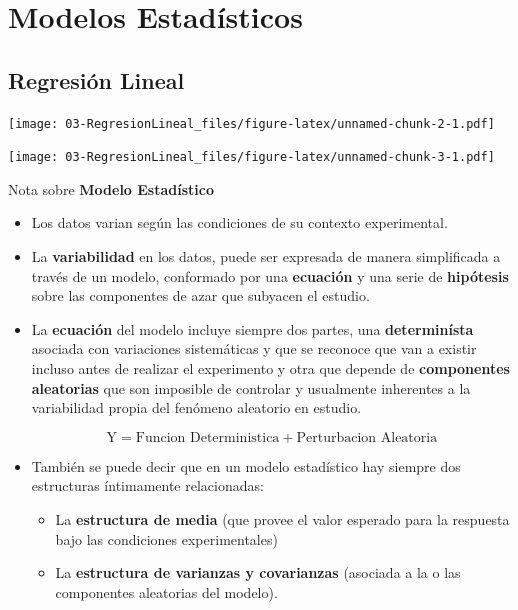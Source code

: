 \documentclass[]{book}
\providecommand{\tightlist}{%
  \setlength{\itemsep}{0pt}\setlength{\parskip}{0pt}}
\begin{document}
\hypertarget{part-modelos-estadisticos}{%
\part{Modelos Estadísticos}\label{part-modelos-estadisticos}}

\hypertarget{regresion-lineal}{%
\chapter{Regresión Lineal}\label{regresion-lineal}}

\texttt{[image: 03-RegresionLineal\_files/figure-latex/unnamed-chunk-2-1.pdf]}

\texttt{[image: 03-RegresionLineal\_files/figure-latex/unnamed-chunk-3-1.pdf]}

Nota sobre \textbf{Modelo Estadístico}

\begin{itemize}
\item
  Los datos varian según las condiciones de su contexto experimental.
\item
  La \textbf{variabilidad} en los datos, puede ser expresada de manera simplificada a través de un modelo, conformado por una \textbf{ecuación} y una serie de \textbf{hipótesis} sobre las componentes de azar que subyacen el estudio.
\item
  La \textbf{ecuación} del modelo incluye siempre dos partes, una \textbf{determinísta} asociada con variaciones sistemáticas y que se reconoce que van a existir incluso antes de realizar el experimento y otra que depende de \textbf{componentes aleatorias} que son imposible de controlar y usualmente inherentes a la variabilidad propia del fenómeno aleatorio en estudio.

  \[ \text{Y} = \text{Funcion Deterministica} + \text{Perturbacion Aleatoria} \]
\item
  También se puede decir que en un modelo estadístico hay siempre dos estructuras íntimamente relacionadas:

  \begin{itemize}
  \tightlist
  \item
    La \textbf{estructura de media} (que provee el valor esperado para la respuesta bajo las condiciones experimentales)
  \item
    La \textbf{estructura de varianzas y covarianzas} (asociada a la o las componentes aleatorias del modelo).
  \end{itemize}
\end{itemize}
\end{document}
